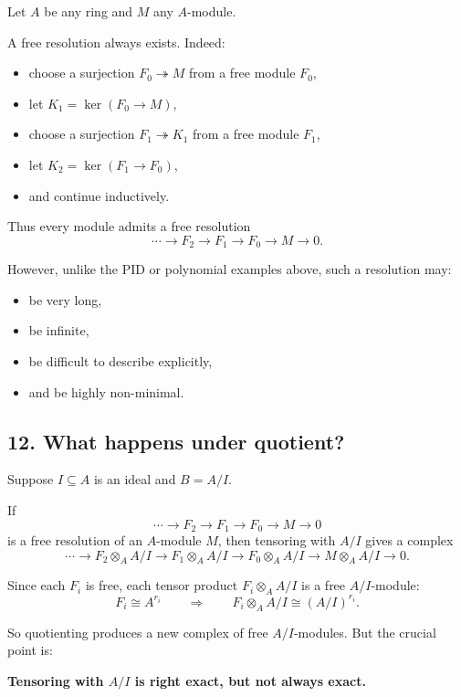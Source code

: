 \documentclass[12pt,a4paper]{article}
\theoremstyle{notespace}
\theoremstyle{definition}
\begin{document}
Let \(A\) be any ring and \(M\) any \(A\)-module.

A free resolution always exists. Indeed:
\begin{itemize}
	\item choose a surjection \(F_0 \twoheadrightarrow M\) from a free module \(F_0\),
	\item let \(K_1=\ker(F_0\to M)\),
	\item choose a surjection \(F_1 \twoheadrightarrow K_1\) from a free module \(F_1\),
	\item let \(K_2=\ker(F_1\to F_0)\),
	\item and continue inductively.
\end{itemize}

Thus every module admits a free resolution
\[
\cdots \longrightarrow F_2 \longrightarrow F_1 \longrightarrow F_0 \longrightarrow M \longrightarrow 0.
\]

However, unlike the PID or polynomial examples above, such a resolution may:
\begin{itemize}
	\item be very long,
	\item be infinite,
	\item be difficult to describe explicitly,
	\item and be highly non-minimal.
\end{itemize}

\subsection{12. What happens under quotient?}

Suppose \(I\subseteq A\) is an ideal and \(B=A/I\).

If
\[
\cdots \longrightarrow F_2 \longrightarrow F_1 \longrightarrow F_0 \longrightarrow M \longrightarrow 0
\]
is a free resolution of an \(A\)-module \(M\), then tensoring with \(A/I\) gives a complex
\[
\cdots \longrightarrow F_2\otimes_A A/I \longrightarrow F_1\otimes_A A/I
\longrightarrow F_0\otimes_A A/I \longrightarrow M\otimes_A A/I \longrightarrow 0.
\]

Since each \(F_i\) is free, each tensor product \(F_i\otimes_A A/I\) is a free \(A/I\)-module:
\[
F_i \cong A^{r_i}
\qquad\Longrightarrow\qquad
F_i\otimes_A A/I \cong (A/I)^{r_i}.
\]

So quotienting produces a new complex of free \(A/I\)-modules. But the crucial point is:

\medskip
\textbf{Tensoring with \(A/I\) is right exact, but not always exact.}
\medskip
\end{document}
